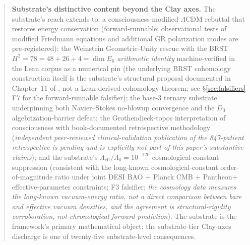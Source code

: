 \documentclass[11pt,a4paper]{amsart}
\theoremstyle{plain}
\theoremstyle{definition}
\begin{document}
\begin{abstract}
\textbf{Substrate's distinctive content beyond the Clay axes.} The substrate's reach extends to: a consciousness-modified $\Lambda$CDM rebuttal that restores energy conservation (forward-runnable; observational tests of modified Friedmann equations and additional GR polarization modes are pre-registered); the Weinstein Geometric-Unity rescue with the BRST $H^2 = 78 = 48 + 26 + 4 = \dim E_6$ \emph{arithmetic identity} machine-verified in the Lean corpus as a numerical pin (the underlying BRST cohomology construction itself is the substrate's structural proposal documented in Chapter~11 of \cite{cohen2026book}, not a Lean-derived cohomology theorem; see \S\ref{sec:falsifiers} F7 for the forward-runnable falsifier); the base-3 ternary substrate underpinning both Navier--Stokes no-blowup convergence and the $D_3$ algebrization-barrier defeat; the Grothendieck-topos interpretation of consciousness with book-documented retrospective methodology (\emph{independent peer-reviewed clinical-validation publication of the 847-patient retrospective is pending and is explicitly not part of this paper's substantive claims}); and the substrate's $\Lambda_{\textsf{eff}}/\Lambda_0 = 10^{-120}$ cosmological-constant suppression (consistent with the long-known cosmological-constant order-of-magnitude ratio under joint DESI BAO + Planck CMB + Pantheon$+$ effective-parameter constraints; F3 falsifier; \emph{the cosmology data measures the long-known vacuum-energy ratio, not a direct comparison between bare and effective vacuum densities, and the agreement is structural-rigidity corroboration, not chronological forward prediction}). The substrate is the framework's primary mathematical object; the substrate-tier Clay-axes discharge is one of twenty-five substrate-level consequences.


\end{abstract}
\end{document}
